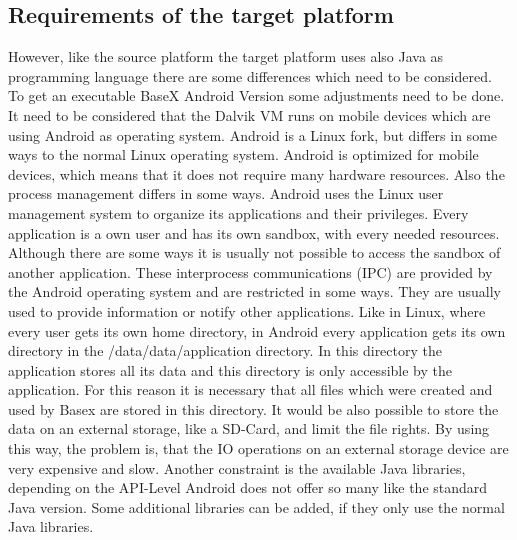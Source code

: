 \subsection{Requirements of the target platform}
\label{sec:migration:requirmenets-of.the-target-platform}
However, like the source platform the target platform uses also Java as programming language there are some differences which need to be considered.
To get an executable BaseX Android Version some adjustments need to be done.
It need to be considered that the Dalvik VM runs on mobile devices which are using Android as operating system.
Android is a Linux fork, but differs in some ways to the normal Linux operating system.
Android is optimized for mobile devices, which means that it does not require many hardware resources.
Also the process management differs in some ways. 
Android uses the Linux user management system to organize its applications and their privileges.
Every application is a own user and has its own sandbox, with every needed resources.
Although there are some ways it is usually not possible to access the sandbox of another application.
These interprocess communications (IPC) are provided by the Android operating system and are restricted in some ways.
They are usually used to provide information or notify other applications.
Like in Linux, where every user gets its own home directory, in Android every application gets its own directory in the /data/data/application directory.
In this directory the application stores all its data and this directory is only accessible by the application.
For this reason it is necessary that all files which were created and used by Basex are stored in this directory.
It would be also possible to store the data on an external storage, like a SD-Card, and limit the file rights.
By using this way, the problem is, that the IO operations on an external storage device are very expensive and slow.
Another constraint is the available Java libraries, depending on the API-Level Android does not offer so many like the standard Java version.
Some additional libraries can be added, if they only use the normal Java libraries.

